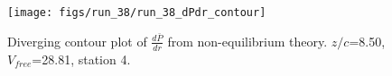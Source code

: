 \begin{figure}[H]
\centering
\texttt{[image: figs/run\_38/run\_38\_dPdr\_contour]}
\caption{Diverging contour plot of $\frac{d\bar{P}}{dr}$ from non-equilibrium theory. $z/c$=8.50, $V_{free}$=28.81, station 4.}
\label{fig:run_38_dPdr_contour}
\end{figure}


